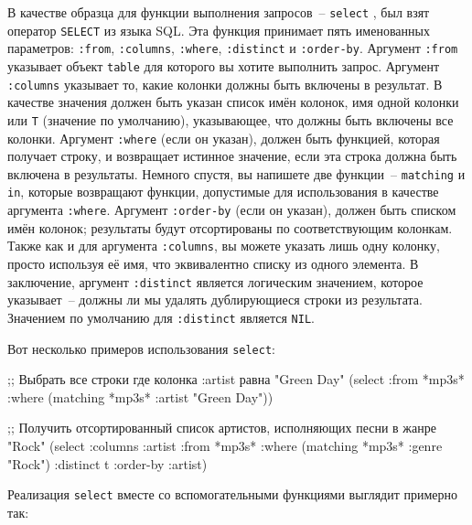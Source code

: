 В качестве образца для функции выполнения запросов~-- \lstinline{select} , был взят оператор
\lstinline{SELECT} из языка SQL. Эта функция принимает пять именованных параметров:
\lstinline{:from}, \lstinline{:columns}, \lstinline{:where}, \lstinline{:distinct} и \lstinline{:order-by}.
Аргумент \lstinline{:from} указывает объект \lstinline{table} для которого вы хотите выполнить
запрос.  Аргумент \lstinline{:columns} указывает то, какие колонки должны быть включены в
результат.  В качестве значения должен быть указан список имён колонок, имя одной колонки
или \lstinline{T} (значение по умолчанию), указывающее, что должны быть включены все колонки.
Аргумент \lstinline{:where} (если он указан), должен быть функцией, которая получает строку, и
возвращает истинное значение, если эта строка должна быть включена в результаты.  Немного
спустя, вы напишете две функции~-- \lstinline{matching} и \lstinline{in}, которые возвращают
функции, допустимые для использования в качестве аргумента \lstinline{:where}.  Аргумент
\lstinline{:order-by} (если он указан), должен быть списком имён колонок; результаты будут
отсортированы по соответствующим колонкам.  Также как и для аргумента \lstinline{:columns}, вы
можете указать лишь одну колонку, просто используя её имя, что эквивалентно списку из
одного элемента.  В заключение, аргумент \lstinline{:distinct} является логическим значением,
которое указывает~-- должны ли мы удалять дублирующиеся строки из результата.  Значением
по умолчанию для \lstinline{:distinct} является \lstinline{NIL}.

Вот несколько примеров использования \lstinline{select}:

\begin{myverb}
;; Выбрать все строки где колонка :artist равна "Green Day"
(select :from *mp3s* :where (matching *mp3s* :artist "Green Day"))

;; Получить отсортированный список артистов, исполняющих песни в жанре "Rock"
(select
  :columns :artist
  :from *mp3s*
  :where (matching *mp3s* :genre "Rock")
  :distinct t
  :order-by :artist)
\end{myverb}

Реализация \lstinline{select} вместе со вспомогательными функциями выглядит примерно так:


